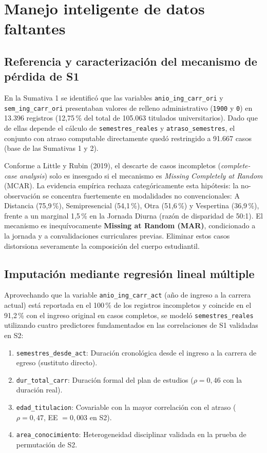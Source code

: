 \documentclass[11pt,a4paper]{article}
\begin{document}
\section{Manejo inteligente de datos faltantes}

\subsection{Referencia y caracterización del mecanismo de pérdida de S1}
En la Sumativa 1 se identificó que las variables \texttt{anio\_ing\_carr\_ori} y \texttt{sem\_ing\_carr\_ori} presentaban valores de relleno administrativo (\texttt{1900} y \texttt{0}) en 13.396 registros (12,75\,\% del total de 105.063 titulados universitarios). Dado que de ellas depende el cálculo de \texttt{semestres\_reales} y \texttt{atraso\_semestres}, el conjunto con atraso computable directamente quedó restringido a 91.667 casos (base de las Sumativas 1 y 2).

Conforme a Little y Rubin (2019), el descarte de casos incompletos (\textit{complete-case analysis}) solo es insesgado si el mecanismo es \textit{Missing Completely at Random} (MCAR). La evidencia empírica rechaza categóricamente esta hipótesis: la no-observación se concentra fuertemente en modalidades no convencionales: A Distancia (75,9\,\%), Semipresencial (54,1\,\%), Otra (51,6\,\%) y Vespertina (36,9\,\%), frente a un marginal 1,5\,\% en la Jornada Diurna (razón de disparidad de 50:1). El mecanismo es inequívocamente \textbf{Missing at Random (MAR)}, condicionado a la jornada y a convalidaciones curriculares previas. Eliminar estos casos distorsiona severamente la composición del cuerpo estudiantil.

\subsection{Imputación mediante regresión lineal múltiple}
Aprovechando que la variable \texttt{anio\_ing\_carr\_act} (año de ingreso a la carrera actual) está reportada en el 100\,\% de los registros incompletos y coincide en el 91,2\,\% con el ingreso original en casos completos, se modeló \texttt{semestres\_reales} utilizando cuatro predictores fundamentados en las correlaciones de S1 validadas en S2:
\begin{enumerate}[leftmargin=*]
\item \texttt{semestres\_desde\_act}: Duración cronológica desde el ingreso a la carrera de egreso (sustituto directo).
\item \texttt{dur\_total\_carr}: Duración formal del plan de estudios ($\rho = 0,46$ con la duración real).
\item \texttt{edad\_titulacion}: Covariable con la mayor correlación con el atraso ($\rho = 0,47$, EE $= 0,003$ en S2).
\item \texttt{area\_conocimiento}: Heterogeneidad disciplinar validada en la prueba de permutación de S2.
\end{enumerate}
\end{document}
